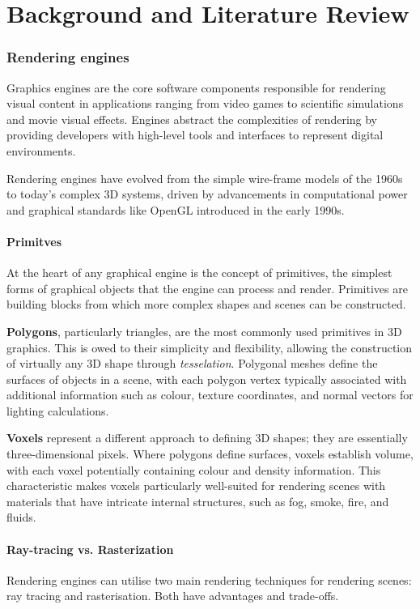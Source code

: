 
\part{Background and Literature Review}\label{backgorund}
\section{Rendering engines}
Graphics engines are the core software components responsible for rendering visual content in applications ranging from video games to scientific simulations and movie visual effects.
Engines abstract the complexities of rendering by providing developers with high-level tools and interfaces to represent digital environments.

Rendering engines have evolved from the simple wire-frame models of the 1960s to today's complex 3D systems, driven by advancements in computational power and graphical standards\cite{old} like OpenGL introduced in the early 1990s.

\subsection{Primitves}
At the heart of any graphical engine is the concept of primitives, the simplest forms of graphical objects that the engine can process and render. Primitives are building blocks from which more complex shapes and scenes can be constructed.

\textbf{Polygons}, particularly triangles, are the most commonly used primitives in 3D graphics. This is owed to their simplicity and flexibility, allowing the construction of virtually any 3D shape through \emph{tesselation}. Polygonal meshes define the surfaces of objects in a scene, with each polygon vertex typically associated with additional information such as colour, texture coordinates, and normal vectors for lighting calculations.

\textbf{Voxels} represent a different approach to defining 3D shapes; they are essentially three-dimensional pixels. Where polygons define surfaces, voxels establish volume, with each voxel potentially containing colour and density information.
This characteristic makes voxels particularly well-suited for rendering scenes with materials that have intricate internal structures, such as fog, smoke, fire, and fluids.

\subsection{Ray-tracing vs. Rasterization}
Rendering engines can utilise two main rendering techniques for rendering scenes: ray tracing and rasterisation. Both have advantages and trade-offs.


